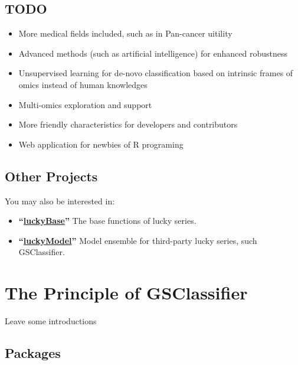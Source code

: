 \documentclass[
  12pt,
]{book}
\begin{document}
\hypertarget{todo}{%
\section*{TODO}\label{todo}}

\begin{itemize}
\item
  More medical fields included, such as in Pan-cancer uitility
\item
  Advanced methods (such as artificial intelligence) for enhanced robustness
\item
  Unsupervised learning for de-novo classification based on intrinsic frames of omics instead of human knowledges
\item
  Multi-omics exploration and support
\item
  More friendly characteristics for developers and contributors
\item
  Web application for newbies of R programing
\end{itemize}

\hypertarget{other-projects}{%
\section*{Other Projects}\label{other-projects}}

You may also be interested in:

\begin{itemize}
\item
  \textbf{``\href{https://github.com/huangwb8/luckyBase}{luckyBase}''} The base functions of lucky series.
\item
  \textbf{``\href{https://github.com/huangwb8/luckyModel}{luckyModel}''} Model ensemble for third-party lucky series, such GSClassifier.
\end{itemize}

\hypertarget{the-principle-of-gsclassifier}{%
\chapter{The Principle of GSClassifier}\label{the-principle-of-gsclassifier}}

Leave some introductions

\hypertarget{packages}{%
\section{Packages}\label{packages}}
\end{document}

